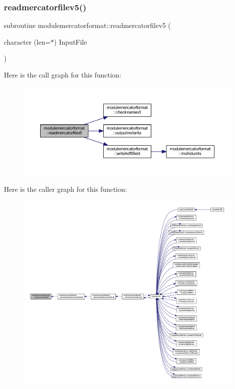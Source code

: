 \subsubsection{\texorpdfstring{readmercatorfilev5()}{readmercatorfilev5()}}
{\footnotesize\ttfamily subroutine modulemercatorformat\+::readmercatorfilev5 (\begin{DoxyParamCaption}\item[{character (len=$\ast$)}]{Input\+File }\end{DoxyParamCaption})\hspace{0.3cm}{\ttfamily [private]}}

Here is the call graph for this function\+:\nopagebreak
\begin{figure}[H]
\begin{center}
\leavevmode
\includegraphics[width=350pt]{namespacemodulemercatorformat_a66a44152e01a257880168d77ee61a18d_cgraph}
\end{center}
\end{figure}
Here is the caller graph for this function\+:\nopagebreak
\begin{figure}[H]
\begin{center}
\leavevmode
\includegraphics[width=350pt]{namespacemodulemercatorformat_a66a44152e01a257880168d77ee61a18d_icgraph}
\end{center}
\end{figure}
\mbox{\label{namespacemodulemercatorformat_a581fc371026e728b42cbf50f824fc39f}} 

